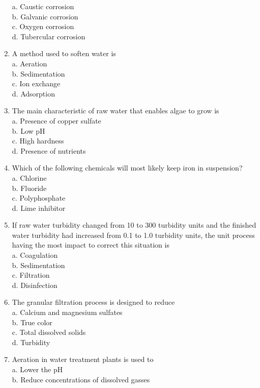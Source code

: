 \begin{enumerate}
a. Caustic corrosion\\
b. Galvanic corrosion\\
c. Oxygen corrosion\\
d. Tubercular corrosion\\
\item A method used to soften water is\\
a. Aeration\\
b. Sedimentation\\
c. Ion exchange\\
d. Adsorption\\
\item The main characteristic of raw water that enables algae to grow is\\
a. Presence of copper sulfate\\
b. Low $\mathrm{pH}$\\
c. High hardness\\
d. Presence of nutrients\\
\item Which of the following chemicals will most likely keep iron in suspension?\\
a. Chlorine\\
b. Fluoride\\
c. Polyphosphate\\
d. Lime inhibitor\\
\item If raw water turbidity changed from 10 to 300 turbidity units and the finished water turbidity had increased from 0.1 to 1.0 turbidity units, the unit process having the most impact to correct this situation is\\
a. Coagulation\\
b. Sedimentation\\
c. Filtration\\
d. Disinfection\\
\item The granular filtration process is designed to reduce\\
a. Calcium and magnesium sulfates\\
b. True color\\
c. Total dissolved solids\\
d. Turbidity\\
\item Aeration in water treatment plants is used to\\
a. Lower the $\mathrm{pH}$\\
b. Reduce concentrations of dissolved gasses\\

\end{enumerate}
